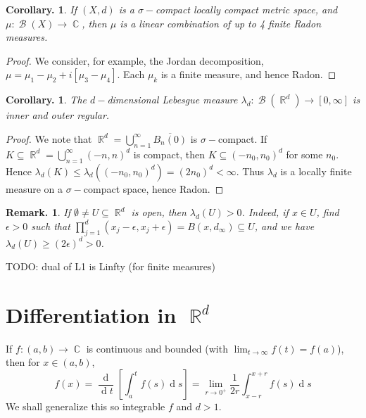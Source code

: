 \documentclass[11pt, a4paper]{memoir}
\DeclareMathOperator{\R}{{\mathbb{R}}}
\DeclareMathOperator{\C}{{\mathbb{C}}}
\newcommand{\ol}[1]{\ensuremath{\overline{#1}}}
\theoremstyle{change}
\newtheorem{corollary}[theorem]{Corollary.}
\theoremstyle{plain}
\theoremstyle{nonumberplain}
\newtheorem{remark}{Remark.}
\newtheorem{proof}{Proof}
\DeclareMathOperator{\B}{{\mathcal{B}}}
\renewcommand{\d}[1]{\ensuremath{\operatorname{d}\!{#1}}}
\numberwithin{equation}{section}
\begin{document}
\begin{corollary}
    If $(X,d)$ is a $\sigma-$compact locally compact metric space, and $\mu:\B(X)\to\C$, then $\mu$ is a linear combination of up to 4 finite Radon measures.
\end{corollary}
\begin{proof}
    We consider, for example, the Jordan decomposition, $\mu=\mu_1-\mu_2+i[\mu_3-\mu_4]$.
    Each $\mu_k$ is a finite measure, and hence Radon.
\end{proof}
\begin{corollary}
    The $d-$dimensional Lebesgue measure $\lambda_d:\B(\R^d)\to[0,\infty]$ is inner and outer regular.
\end{corollary}
\begin{proof}
    We note that $\R^d=\bigcup_{n=1}^\infty\ol{B_n(0)}$ is $\sigma-$compact.
    If $K\subseteq\R^d=\bigcup_{n=1}^\infty(-n,n)^d$ is compact, then $K\subseteq(-n_0,n_0)^d$ for some $n_0$.
    Hence $\lambda_d(K)\leq\lambda_d((-n_0,n_0)^d)=(2n_0)^d<\infty$.
    Thus $\lambda_d$ is a locally finite measure on a $\sigma-$compact space, hence Radon.
\end{proof}
\begin{remark}
    If $\emptyset\neq U\subseteq\R^d$ is open, then $\lambda_d(U)>0$.
    Indeed, if $x\in U$, find $\epsilon>0$ such that $\prod_{j=1}^d(x_j-\epsilon,x_j+\epsilon)=B(x,d_\infty)\subseteq U$, and we have $\lambda_d(U)\geq(2\epsilon)^d>0$.
\end{remark}
TODO: dual of L1 is Linfty (for finite measures)
\section{Differentiation in \texorpdfstring{$\R^d$}{Rd}}
If $f:(a,b)\to\C$ is continuous and bounded (with $\lim_{t\to\infty}f(t)=f(a)$), then for $x\in(a,b)$,
\begin{equation*}
    f(x)=\frac{\d{}}{\d{t}}\left[\int_a^t f(s)\d{s}\right]=\lim_{r\to 0^+}\frac{1}{2r}\int_{x-r}^{x+r}f(s)\d{s}
\end{equation*}
We shall generalize this so integrable $f$ and $d>1$.
\end{document}
